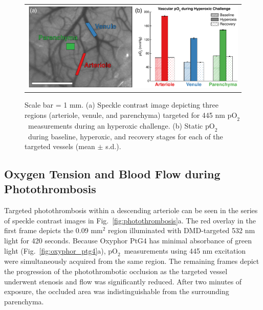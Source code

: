 \documentclass[12pt]{spieman}  %
\newcommand{\pO}{\ensuremath{\text{pO}_2}}
\begin{document}
\begin{spacing}{2}
\begin{figure}
    \begin{center}
        \begin{tabular}{c}
            \includegraphics[width=6.25in]{Figure4.pdf}
        \end{tabular}
    \end{center}
    \caption {
        \label{fig:hyperoxic_challenge}
        Scale bar = 1 mm. (a) Speckle contrast image depicting three regions (arteriole, venule, and parenchyma) targeted for 445 nm \pO\ measurements during an hyperoxic challenge. (b) Static \pO\ during baseline, hyperoxic, and recovery stages for each of the targeted vessels (mean $\pm$ s.d.).
    }
\end{figure}


\subsection{Oxygen Tension and Blood Flow during Photothrombosis}
Targeted photothrombosis within a descending arteriole can be seen in the series of speckle contrast images in Fig.~\ref{fig:photothrombosis}a. The red overlay in the first frame depicts the 0.09 mm$^{2}$ region illuminated with DMD-targeted 532 nm light for 420 seconds. Because Oxyphor PtG4 has minimal absorbance of green light (Fig.~\ref{fig:oxyphor_ptg4}a), \pO\ measurements using 445 nm excitation were simultaneously acquired from the same region. The remaining frames depict the progression of the photothrombotic occlusion as the targeted vessel underwent stenosis and flow was significantly reduced. After two minutes of exposure, the occluded area was indistinguishable from the surrounding parenchyma.


\end{spacing}
\end{document}
